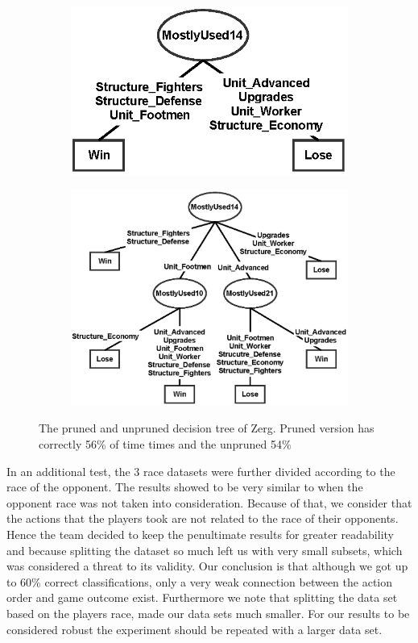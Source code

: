 \documentclass[a4paper,11pt]{article}
\begin{document}
\begin{figure}[H]
\centering
\begin{subfigure}{.4\textwidth}
  \centering
  \includegraphics[width=.95\linewidth]{tree_zerg_pruned}
\end{subfigure}%
\begin{subfigure}{.4\textwidth}
  \centering
  \includegraphics[width=.95\linewidth]{tree_zerg_unpruned}
\end{subfigure}
\caption{The pruned and unpruned decision tree of Zerg. Pruned version has correctly 56\% of time times and the unpruned 54\%}
\label{fig:win:zerg}
\end{figure}

In an additional test, the 3 race datasets were further divided according to the race of the opponent. The results showed to be very similar to when the opponent race was not taken into consideration. Because of that, we consider that the actions that the players took are not related to the race of their opponents. Hence the team decided to keep the penultimate results for greater readability and because splitting the dataset so much left us with very small subsets, which was considered a threat to its validity.
Our conclusion is that although we got up to 60\% correct classifications, only a very weak connection between the action order and game outcome exist. Furthermore we note that splitting the data set based on the players race, made our data sets much smaller. For our results to be considered robust the experiment should be repeated with a larger data set.
\end{document}
